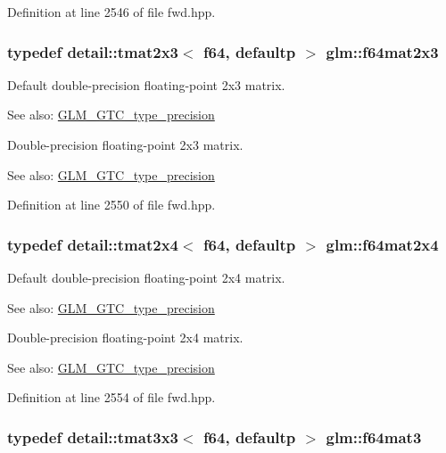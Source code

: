 Definition at line 2546 of file fwd.hpp.\hypertarget{group__gtc__type__precision_g5b665390818b04bdd95bb6b2a25e5c2c}{
\subsubsection[f64mat2x3]{\setlength{\rightskip}{0pt plus 5cm}typedef detail::tmat2x3$<$ f64, defaultp $>$ {\bf glm::f64mat2x3}}}
\label{group__gtc__type__precision_g5b665390818b04bdd95bb6b2a25e5c2c}


Default double-precision floating-point 2x3 matrix. \begin{Desc}
\item[See also:]\hyperlink{group__gtc__type__precision}{GLM\_\-GTC\_\-type\_\-precision}\end{Desc}
Double-precision floating-point 2x3 matrix. \begin{Desc}
\item[See also:]\hyperlink{group__gtc__type__precision}{GLM\_\-GTC\_\-type\_\-precision} \end{Desc}


Definition at line 2550 of file fwd.hpp.\hypertarget{group__gtc__type__precision_g7f84d2c51081d56599a45c01d67ac155}{
\subsubsection[f64mat2x4]{\setlength{\rightskip}{0pt plus 5cm}typedef detail::tmat2x4$<$ f64, defaultp $>$ {\bf glm::f64mat2x4}}}
\label{group__gtc__type__precision_g7f84d2c51081d56599a45c01d67ac155}


Default double-precision floating-point 2x4 matrix. \begin{Desc}
\item[See also:]\hyperlink{group__gtc__type__precision}{GLM\_\-GTC\_\-type\_\-precision}\end{Desc}
Double-precision floating-point 2x4 matrix. \begin{Desc}
\item[See also:]\hyperlink{group__gtc__type__precision}{GLM\_\-GTC\_\-type\_\-precision} \end{Desc}


Definition at line 2554 of file fwd.hpp.\hypertarget{group__gtc__type__precision_ga9e69ab90c0130b9a84a0a7fd8e49664}{
\subsubsection[f64mat3]{\setlength{\rightskip}{0pt plus 5cm}typedef detail::tmat3x3$<$ f64, defaultp $>$ {\bf glm::f64mat3}}}
\label{group__gtc__type__precision_ga9e69ab90c0130b9a84a0a7fd8e49664}


